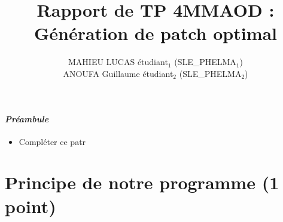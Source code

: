 \documentclass[a4paper, 10pt, french]{article}
\title{Rapport de TP 4MMAOD : Génération de patch optimal}
\author{
MAHIEU LUCAS étudiant$_1$ (SLE\_PHELMA$_1$) 
\\ ANOUFA Guillaume étudiant$_2$ (SLE\_PHELMA$_2$) 
}
\begin{document}
\maketitle

\paragraph{\em Préambule}
{\em \begin{itemize} 
   \item Compléter ce patr
\end{itemize}
}

\section{Principe de notre  programme (1 point)}
\end{document}
